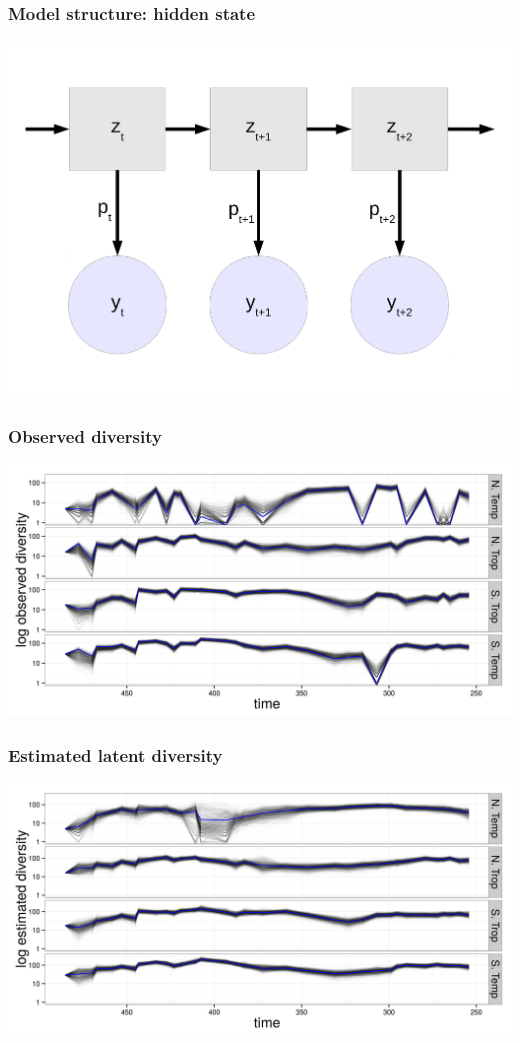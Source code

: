 \documentclass{beamer}
\begin{document}
\begin{frame}
  \frametitle{Model structure: hidden state}
  \begin{center}
    \includegraphics[width=\textwidth,height=0.8\textheight,keepaspectratio=true]{figure/hidden_state}
  \end{center}
\end{frame}

\begin{frame}
  \frametitle{Observed diversity}
  \begin{center}
    \includegraphics[width=\textwidth,height=0.8\textheight,keepaspectratio=true]{figure/obs_div}
  \end{center}
\end{frame}

\begin{frame}
  \frametitle{Estimated latent diversity}
  \begin{center}
    \includegraphics[width=\textwidth,height=0.8\textheight,keepaspectratio=true]{figure/true_div}
  \end{center}
\end{frame}
\end{document}
